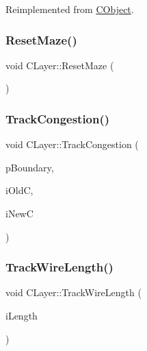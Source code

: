 Reimplemented from \mbox{\hyperlink{classCObject_a75afd905b2d14ed374c75d90f079a389}{C\+Object}}.

\mbox{\label{classCLayer_a7f89eaebcbf57737b1522bcec4ca8bbd}} 
\subsubsection{\texorpdfstring{ResetMaze()}{ResetMaze()}}
{\footnotesize\ttfamily void C\+Layer\+::\+Reset\+Maze (\begin{DoxyParamCaption}{ }\end{DoxyParamCaption})}

\mbox{\label{classCLayer_afff67e1cbe36c1bbf689505f3f03064c}} 
\subsubsection{\texorpdfstring{TrackCongestion()}{TrackCongestion()}}
{\footnotesize\ttfamily void C\+Layer\+::\+Track\+Congestion (\begin{DoxyParamCaption}\item[{\mbox{\hyperlink{classCBoundary}{C\+Boundary}} $\ast$}]{p\+Boundary,  }\item[{int}]{i\+OldC,  }\item[{int}]{i\+NewC }\end{DoxyParamCaption})}

\mbox{\label{classCLayer_a3b389c13f895286dbe16df369a4f7787}} 
\subsubsection{\texorpdfstring{TrackWireLength()}{TrackWireLength()}}
{\footnotesize\ttfamily void C\+Layer\+::\+Track\+Wire\+Length (\begin{DoxyParamCaption}\item[{int}]{i\+Length }\end{DoxyParamCaption})}

\mbox{\label{classCLayer_a141f6d1ca53bf7ad0d39ad5caec04afb}} 
